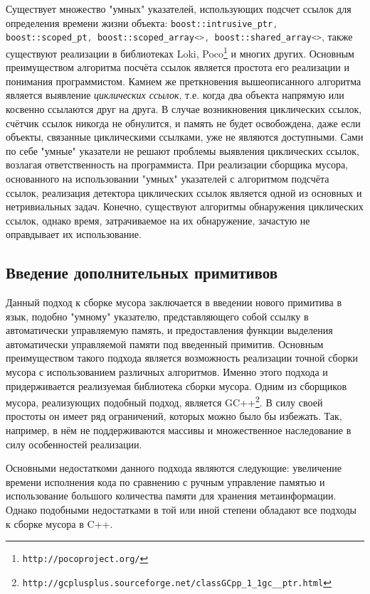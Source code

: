 Существует множество "умных" указателей, использующих подсчет ссылок для определения времени жизни объекта:
\lstinline[language= cpp]{boost::intrusive_ptr, boost::scoped_pt, boost::scoped_array<>, boost::shared_array<>},
также существуют реализации в библиотеках Loki\cite{Alexandrescu}, Poco\footnote{\texttt{http://pocoproject.org/}} и многих других.
Основным преимуществом алгоритма посчёта ссылок является простота его реализации и понимания программистом.
Камнем же преткновения вышеописанного алгоритма является выявление \textit{циклических ссылок}, т.е. когда два объекта
напрямую или косвенно ссылаются друг на друга. В случае возникновения циклических ссылок, счётчик ссылок никогда не обнулится,
и память не будет освобождена, даже если объекты, связанные циклическими ссылками, уже не являются доступными.
Сами по себе "умные" указатели не решают проблемы выявления циклических ссылок, возлагая ответственность на программиста.
При реализации сборщика мусора, основанного на использовании "умных" указателей с алгоритмом подсчёта ссылок,
реализация детектора циклических ссылок является одной из основных и нетривиальных задач.
Конечно, существуют алгоритмы обнаружения циклических ссылок, однако время, затрачиваемое на их обнаружение,
зачастую не оправдывает их использование.

\subsection{Введение дополнительных примитивов}
Данный подход к сборке мусора заключается в введении нового примитива в язык, подобно "умному" указателю,
представляющего собой ссылку в автоматически управляемую память, и предоставления функции выделения автоматически управляемой
памяти под введенный примитив.
Основным преимуществом такого подхода является возможность реализации точной сборки мусора с использованием различных алгоритмов.
Именно этого подхода и придерживается реализуемая библиотека сборки мусора.
Одним из сборщиков мусора, реализующих подобный подход, является GC++\footnote{\texttt{http://gcplusplus.sourceforge.net/classGCpp\_1\_1gc\_\_ptr.html}}. В силу своей простоты он имеет ряд ограничений, которых можно было бы избежать.
Так, например, в нём не поддерживаются массивы и множественное наследование в силу особенностей реализации.

Основными недостаткоми данного подхода являются следующие:
увеличение времени исполнения кода по сравнению с ручным управление памятью
и использование большого количества памяти для хранения метаинформации.
Однако подобными недостатками в той или иной степени обладают все подходы к сборке мусора в C++.

